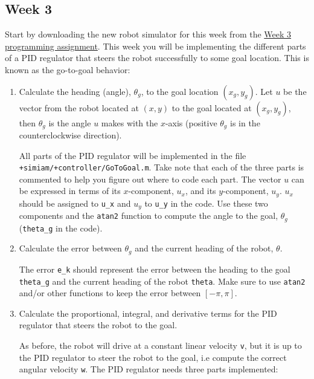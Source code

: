 \documentclass[10pt]{article}
\begin{document}
\subsection{Week 3}

Start by downloading the new robot simulator for this week from the \href{}{Week 3 programming assignment}. This week you will be implementing the different parts of a PID regulator that steers the robot successfully to some goal location. This is known as the go-to-goal behavior:

\begin{enumerate}
 \item Calculate the heading (angle), $\theta_g$, to the goal location $(x_g,y_g)$. Let $u$ be the vector from the robot located at $(x,y)$ to the goal located at $(x_g,y_g)$, then $\theta_g$ is the angle $u$ makes with the $x$-axis (positive $\theta_g$ is in the counterclockwise direction).

All parts of the PID regulator will be implemented in the file \texttt{+simiam/+controller/GoToGoal.m}. Take note that each of the three parts is commented to help you figure out where to code each part. The vector $u$ can be expressed in terms of its $x$-component, $u_x$, and its $y$-component, $u_y$. $u_x$ should be assigned to \texttt{u\_x} and $u_y$ to \texttt{u\_y} in the code. Use these two components and the \texttt{atan2} function to compute the angle to the goal, $\theta_g$ (\texttt{theta\_g} in the code).


 \item Calculate the error between $\theta_g$ and the current heading of the robot, $\theta$.
 
 The error \texttt{e\_k} should represent the error between the heading to the goal \texttt{theta\_g} and the current heading of the robot \texttt{theta}. Make sure to use \texttt{atan2} and/or other functions to keep the error between $[-\pi,\pi]$.
 
 \item Calculate the proportional, integral, and derivative terms for the PID regulator that steers the robot to the goal.
 
 As before, the robot will drive at a constant linear velocity \texttt{v}, but it is up to the PID regulator to steer the robot to the goal, i.e compute the correct angular velocity \texttt{w}. The PID regulator needs three parts implemented:
 

\end{enumerate}
\end{document}
